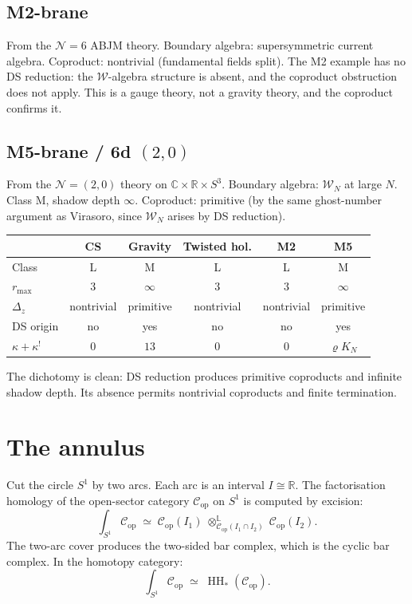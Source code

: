 \documentclass[11pt]{article}
\newcommand{\cC}{\mathcal{C}}
\newcommand{\cN}{\mathcal{N}}
\newcommand{\cW}{\mathcal{W}}
\newcommand{\C}{\mathbb{C}}
\newcommand{\R}{\mathbb{R}}
\newcommand{\HH}{\operatorname{HH}}
\begin{document}
\subsection*{M2-brane}

From the $\cN = 6$ ABJM theory.  Boundary algebra: supersymmetric
current algebra.  Coproduct: nontrivial (fundamental fields split).
The M2 example has no DS reduction: the $\cW$-algebra structure is
absent, and the coproduct obstruction does not apply.  This is a
gauge theory, not a gravity theory, and the coproduct confirms it.

\subsection*{M5-brane / 6d $(2,0)$}

From the $\cN = (2,0)$ theory on $\C \times \R \times S^3$.
Boundary algebra: $\cW_N$ at large $N$.  Class M, shadow depth
$\infty$.  Coproduct: primitive (by the same ghost-number
argument as Virasoro, since $\cW_N$ arises by DS reduction).

\begin{center}
\small
\renewcommand{\arraystretch}{1.15}
\begin{tabular}{@{}lccccc@{}}
 & CS & Gravity & Twisted hol. & M2 & M5 \\
\hline
Class & L & M & L & L & M \\
$r_{\max}$ & $3$ & $\infty$ & $3$ & $3$ & $\infty$ \\
$\Delta_z$ & nontrivial & primitive & nontrivial
  & nontrivial & primitive \\
DS origin & no & yes & no & no & yes \\
$\kappa + \kappa^!$ & $0$ & $13$ & $0$ & $0$ & $\varrho K_N$
\end{tabular}
\end{center}

\medskip

The dichotomy is clean: DS reduction produces primitive
coproducts and infinite shadow depth.  Its absence permits
nontrivial coproducts and finite termination.


\section{The annulus}
\label{sec:annulus}

Cut the circle $S^1$ by two arcs.  Each arc is an interval
$I \cong \R$.  The factorisation homology of the open-sector
category $\cC_{\mathrm{op}}$ on $S^1$ is computed by excision:
\[
\int_{S^1} \cC_{\mathrm{op}}
\;\simeq\;
\cC_{\mathrm{op}}(I_1)
\;\otimes_{\cC_{\mathrm{op}}(I_1 \cap I_2)}^{\mathbb{L}}\;
\cC_{\mathrm{op}}(I_2).
\]
The two-arc cover produces the two-sided bar complex, which is
the cyclic bar complex.  In the homotopy category:
\begin{equation}\label{eq:annulus-trace-wn}
\int_{S^1} \cC_{\mathrm{op}}
\;\simeq\;
\HH_*(\cC_{\mathrm{op}}).
\end{equation}
\end{document}
